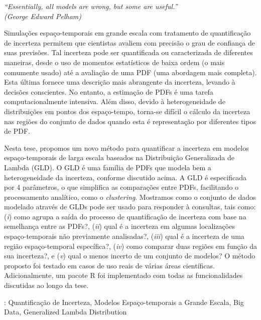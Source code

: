 \documentclass[
	12pt,				%
	openright,			%
	oneside,			%
	a4paper,			%
	sumario=tradicional,%
	brazil,			%
	french,				%
	spanish,			%
	english				%
	]{abntex2}
\theoremstyle{plain}
\theoremstyle{definition}
\begin{document}
\begin{epigrafe}
    \vspace*{\fill}
	\begin{flushright}
		\textit{``Essentially, all models are wrong, but some are useful.''\\
		(George Edward Pelham)}
	\end{flushright}
\end{epigrafe}


\setlength{\absparsep}{18pt} %
\begin{resumo}[Resumo]
Simulações espaço-temporais em grande escala com tratamento de quantificação de incerteza permitem que cientistas avaliem com precisão o grau de confiança de suas previsões. Tal incerteza pode ser quantificada ou caracterizada de diferentes maneiras, desde o uso de momentos estatísticos de baixa ordem (o mais comumente usado) até a avaliação de uma PDF (uma abordagem mais completa). Esta última fornece uma descrição mais abrangente da incerteza, levando à decisões conscientes. No entanto, a estimação de PDFs é uma tarefa computacionalmente intensiva. Além disso, devido à heterogeneidade de distribuições em pontos dos espaço-tempo, torna-se difícil o cálculo da incerteza nas regiões do conjunto de dados quando esta é representação por diferentes tipos de PDF.
 
Nesta tese, propomos um novo método para quantificar a incerteza em modelos espaço-temporais de larga escala baseados na Distribuição Generalizada de Lambda (GLD). O GLD é uma família de PDFs que modela bem a heterogeneidade da incerteza, conforme discutido acima. A GLD é especificada por 4 parâmetros, o que simplifica as comparações entre PDFs, facilitando o processamento analítico, como o \textit{clustering}. Mostramos como o conjunto de dados modelado através de GLDs pode ser usado para responder à consultas, tais como: (\textit{i}) como agrupa a saída do processo de quantificação de incerteza com base na semelhança entre as PDFs?, (\textit{ii}) qual é a incerteza em algumas localizações espaço-temporais não previamente analisadas?, (\textit{iii}) qual é a incerteza de uma região espaço-temporal específica?, (\textit{iv}) como comparar duas regiões em função da sua incerteza?, e (\textit{v}) qual o menos incerto de um conjunto de modelos?
O método proposto foi testado em casos de uso reais de várias áreas científicas. Adicionalmente, um pacote R foi implementado com todas as funcionalidades discutidas ao longo da tese.

 \textbf{\palavrasChave}: Quantificação de Incerteza, Modelos Espaço-temporais a Grande Escala, Big Data, Generalized Lambda Distribution
\end{resumo}
\end{document}
